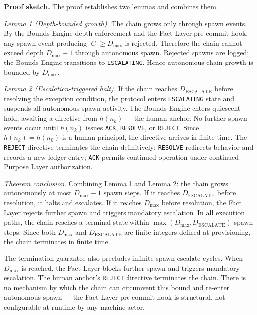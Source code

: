 \medskip
\noindent\textbf{Proof sketch.} The proof establishes two lemmas and combines them.

\medskip
\textit{Lemma 1 (Depth-bounded growth).} The chain grows only through spawn events. By the Bounds Engine depth enforcement and the Fact Layer pre-commit hook, any spawn event producing $|C| \geq D_{\mathrm{max}}$ is rejected. Therefore the chain cannot exceed depth $D_{\mathrm{max}} - 1$ through autonomous spawn. Rejected spawns are logged; the Bounds Engine transitions to \texttt{ESCALATING}. Hence autonomous chain growth is bounded by $D_{\mathrm{max}}$.

\medskip
\textit{Lemma 2 (Escalation-triggered halt).} If the chain reaches $D_{\mathrm{ESCALATE}}$ before resolving the exception condition, the protocol enters \texttt{ESCALATING} state and suspends all autonomous spawn activity. The Bounds Engine enters quiescent hold, awaiting a directive from $h(n_k)$ --- the human anchor. No further spawn events occur until $h(n_k)$ issues \texttt{ACK}, \texttt{RESOLVE}, or \texttt{REJECT}. Since $h(n_k) = h(n_0)$ is a human principal, the directive arrives in finite time. The \texttt{REJECT} directive terminates the chain definitively; \texttt{RESOLVE} redirects behavior and records a new ledger entry; \texttt{ACK} permits continued operation under continued Purpose Layer authorization.

\medskip
\textit{Theorem conclusion.} Combining Lemma 1 and Lemma 2: the chain grows autonomously at most $D_{\mathrm{max}} - 1$ spawn steps. If it reaches $D_{\mathrm{ESCALATE}}$ before resolution, it halts and escalates. If it reaches $D_{\mathrm{max}}$ before resolution, the Fact Layer rejects further spawn and triggers mandatory escalation. In all execution paths, the chain reaches a terminal state within $\max(D_{\mathrm{max}}, D_{\mathrm{ESCALATE}})$ spawn steps. Since both $D_{\mathrm{max}}$ and $D_{\mathrm{ESCALATE}}$ are finite integers defined at provisioning, the chain terminates in finite time. $\square$

The termination guarantee also precludes infinite spawn-escalate cycles. When $D_{\mathrm{max}}$ is reached, the Fact Layer blocks further spawn and triggers mandatory escalation. The human anchor's \texttt{REJECT} directive terminates the chain. There is no mechanism by which the chain can circumvent this bound and re-enter autonomous spawn --- the Fact Layer pre-commit hook is structural, not configurable at runtime by any machine actor.

